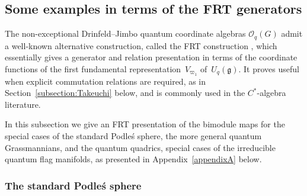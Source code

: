 \documentclass[pdftex]{sigma}
\numberwithin{equation}{section}
\begin{document}
\subsection{Some examples in terms of the FRT generators} \label{subsection:FRT}

The non-exceptional Drinfeld--Jimbo quantum coordinate algebras $\mathcal{O}_q(G)$ admit a well-known alternative construction, called the FRT construction \cite{FRT89}, which essentially gives a generator and relation presentation in terms of the coordinate functions of the first fundamental representation~$V_{\varpi_1}$ of~$U_q(\mathfrak{g})$. It proves useful when explicit commutation relations are required, as in Section~\ref{subsection:Takeuchi} below, and is commonly used in the $C^*$-algebra literature.

In this subsection we give an FRT presentation of the bimodule maps for the special cases of the standard Podle\'s sphere, the more general quantum Grassmannians, and the quantum quadrics, special cases of the irreducible quantum flag manifolds, as presented in Appendix~\ref{appendixA} below.

\subsubsection{The standard Podle\'s sphere}
\end{document}
